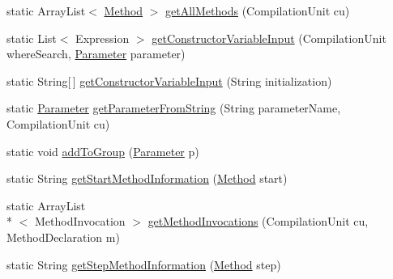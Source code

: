 \begin{DoxyCompactItemize}
\item 
static Array\-List$<$ \hyperlink{classit_1_1isislab_1_1masonhelperdocumentation_1_1analizer_1_1_method}{Method} $>$ \hyperlink{classit_1_1isislab_1_1masonhelperdocumentation_1_1analizer_1_1_global_utility_aaa103a9dda7ed0230fd1f8d65d4cc5d4}{get\-All\-Methods} (Compilation\-Unit cu)
\item 
static List$<$ Expression $>$ \hyperlink{classit_1_1isislab_1_1masonhelperdocumentation_1_1analizer_1_1_global_utility_ac02c87f830dcda9fd30c1568a7dc288e}{get\-Constructor\-Variable\-Input} (Compilation\-Unit where\-Search, \hyperlink{classit_1_1isislab_1_1masonhelperdocumentation_1_1analizer_1_1_parameter}{Parameter} parameter)
\item 
static String\mbox{[}$\,$\mbox{]} \hyperlink{classit_1_1isislab_1_1masonhelperdocumentation_1_1analizer_1_1_global_utility_aacfe3787e1aea29b4d37e9b33ccf9668}{get\-Constructor\-Variable\-Input} (String initialization)
\item 
static \hyperlink{classit_1_1isislab_1_1masonhelperdocumentation_1_1analizer_1_1_parameter}{Parameter} \hyperlink{classit_1_1isislab_1_1masonhelperdocumentation_1_1analizer_1_1_global_utility_ad7c0b1c480e30f055bb39d24c68902e7}{get\-Parameter\-From\-String} (String parameter\-Name, Compilation\-Unit cu)
\item 
static void \hyperlink{classit_1_1isislab_1_1masonhelperdocumentation_1_1analizer_1_1_global_utility_a06daece834a2d24547ab35da71fde6b1}{add\-To\-Group} (\hyperlink{classit_1_1isislab_1_1masonhelperdocumentation_1_1analizer_1_1_parameter}{Parameter} p)
\item 
static String \hyperlink{classit_1_1isislab_1_1masonhelperdocumentation_1_1analizer_1_1_global_utility_ab7e5b73e3d75474c8c42c9acfc3d6939}{get\-Start\-Method\-Information} (\hyperlink{classit_1_1isislab_1_1masonhelperdocumentation_1_1analizer_1_1_method}{Method} start)
\item 
static Array\-List\\*
$<$ Method\-Invocation $>$ \hyperlink{classit_1_1isislab_1_1masonhelperdocumentation_1_1analizer_1_1_global_utility_a453951134e79fd0f3d0c0a7e879ed6ee}{get\-Method\-Invocations} (Compilation\-Unit cu, Method\-Declaration m)
\item 
static String \hyperlink{classit_1_1isislab_1_1masonhelperdocumentation_1_1analizer_1_1_global_utility_a1ee560efb9fe7cbafe03ad927e73249c}{get\-Step\-Method\-Information} (\hyperlink{classit_1_1isislab_1_1masonhelperdocumentation_1_1analizer_1_1_method}{Method} step)
\item 

\end{DoxyCompactItemize}
